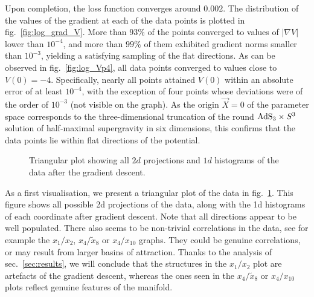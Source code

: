 \documentclass[11pt,a4paper]{article}
\newcommand{\ce}[1]{\marginpar{\parbox{\marginparwidth}{\boldmath $\Longleftarrow$}}{\boldmath\bfseries (ce: #1)}}
\begin{document}
	Upon completion, the loss function converges around $0.002$. The distribution of the values of the gradient at each of the data points is plotted in fig.~\ref{fig:log_grad_V}. More than $93\%$ of the points converged to values of $\vert\nabla V\vert$ lower than $10^{-4}$, and more than $99\%$ of them exhibited gradient norms smaller than $10^{-3}$, yielding a satisfying sampling of the flat directions. As can be observed in fig.~\ref{fig:log_Vp4}, all data points converged to values close to $V(0)=-4$. Specifically, nearly all points attained $V(0)$ within an absolute error of at least $10^{-4}$, with the exception of four points whose deviations were of the order of $10^{-3}$ (not visible on the graph). As the origin $\vec{X}=0$ of the parameter space corresponds to the three-dimensional truncation of the round ${\rm AdS}_{3}\times S^{3}$ solution of half-maximal supergravity in six dimensions, this confirms that the data points lie within flat directions of the potential.

	\begin{figure}
		\centering
		\caption{Triangular plot showing all $2d$ projections and $1d$ histograms of the data after the gradient descent.}
		\label{triangular_plot_1_2_4_8_10}
	\end{figure}
	
	As a first visualisation, we present a triangular plot of the data in fig.~\ref{triangular_plot_1_2_4_8_10}. \ce{Sure of the use of ``triangular''?} This figure shows all possible 2d projections of the data, along with the 1d histograms of each coordinate after gradient descent. Note that all directions appear to be well populated. There also seems to be non-trivial correlations in the data, see for example the $x_1/x_2$, $x_4/\tilde{x}_8$ or $x_4/x_{10}$ graphs. They could be genuine correlations, or may result from larger basins of attraction. Thanks to the analysis of sec.~\ref{sec:results}, we will conclude that the structures in the $x_1/x_2$ plot are artefacts of the gradient descent, whereas the ones seen in the $x_4/\tilde{x}_8$ or $x_4/x_{10}$ plots reflect genuine features of the manifold. 
\end{document}
